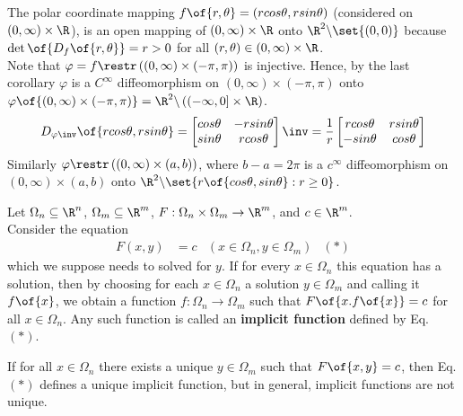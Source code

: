 \begin{example}
    The polar coordinate mapping $f\of{r, \theta} = \left(rcos\theta, rsin\theta\right)$ (considered on $(0, \infty) \times \R$), is an open mapping of $(0, \infty) \times \R$ onto $\R^2 \backslash \set{(0,0)}$ because $\det\of{D_f\of{r, \theta}} = r > 0$ for all $(r, \theta) \in (0, \infty) \times \R$.  \\
    Note that $\varphi = f \restr \left((0, \infty) \times (-\pi, \pi)\right)$ is injective. Hence, by the last corollary $\varphi$ is a $C^\infty$ diffeomorphism on $(0, \infty) \times (-\pi, \pi)$ onto $\varphi\of{(0, \infty) \times (-\pi, \pi)} = \R^2 \backslash \left((-\infty, 0] \times \R\right)$.
    $$D_{\varphi\inv}\of{rcos\theta, rsin\theta} = \begin{bmatrix} cos\theta & -rsin\theta \\ sin\theta & rcos\theta \end{bmatrix}\inv = \frac{1}{r}\begin{bmatrix} rcos\theta & rsin\theta \\ -sin\theta & cos\theta \end{bmatrix}$$
    Similarly $\varphi \restr \left((0, \infty) \times (a,b)\right)$, where $b - a = 2\pi$ is a $c^\infty$ diffeomorphism on $(0, \infty) \times (a,b)$ onto $\R^2 \backslash \set{r\of{cos\theta, sin\theta}: r \geq 0}$.
\end{example}

\begin{definition}
    Let $\Omega_n \subseteq \R^n$, $\Omega_m \subseteq \R^m$, $F: \Omega_n \times \Omega_m \to \R^{m}$, and $c \in \R^{m}$. \\
    Consider the equation \begin{align*}
        F(x,y) &= c & (x \in \Omega_n, y \in \Omega_m) & (*)
    \end{align*} which we suppose needs to solved for $y$. If for every $x \in \Omega_n$ this equation has a solution, then by choosing for each $x \in \Omega_n$ a solution $y \in \Omega_m$ and calling it $f\of{x}$, we obtain a function $f: \Omega_n \to \Omega_m$ such that $F\of{x. f\of{x}} = c$ for all $x \in \Omega_n$. Any such function is called an \textbf{implicit function} defined by Eq. $(*)$. \\
    \begin{note}
        If for all $x \in \Omega_n$ there exists a unique $y \in \Omega_m$ such that $F\of{x,y} = c$, then Eq. $(*)$ defines a unique implicit function, but in general, implicit functions are not unique.
    \end{note}
\end{definition}

